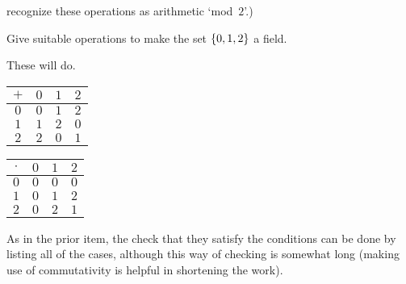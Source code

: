 \begin{exercises}
\begin{answer}
       recognize these operations as arithmetic `mod~$2$'.)
     \end{answer}
  \item 
     Give suitable operations to make the set $\mbox{$\{0,1,2\}$}$
     a field.     
     \begin{answer}
       These will do.
       \begin{center}
          \begin{tabular}{c|ccc}
             \( + \) &\( 0 \) &\( 1 \) &$2$ \\
             \hline
             \( 0 \) &\( 0 \) &\( 1 \) &$2$ \\
             \( 1 \) &\( 1 \) &\( 2 \) &$0$ \\
             $2$     &$2$     &$0$     &$1$
          \end{tabular}
          \qquad
          \begin{tabular}{c|ccc}
            \( \cdot \) &\( 0 \) &\( 1 \) &$2$ \\
            \hline
            \( 0 \)  &\( 0 \) &\( 0 \) &$0$ \\
            \( 1 \)  &\( 0 \) &\( 1 \) &$2$ \\
            $2$      &$0$     &$2$     &$1$
          \end{tabular}
       \end{center}
       As in the prior item, the check that they satisfy the conditions can 
       be done by listing all of the cases, although this way of checking is
       somewhat long (making use of commutativity is helpful in 
       shortening the work).
     \end{answer}
\end{exercises}
%
%

